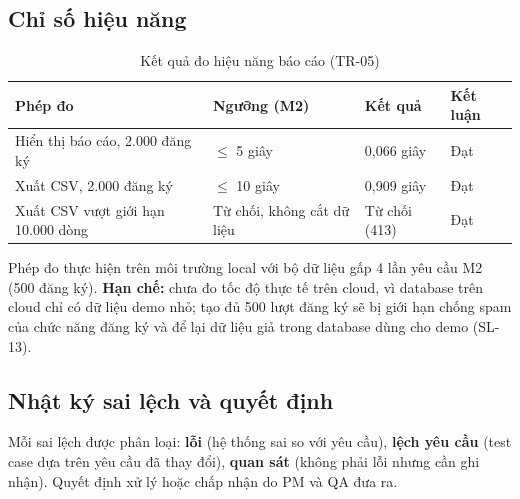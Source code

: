\subsection{Chỉ số hiệu năng}

\begin{table}[H]
\centering\small
\caption{Kết quả đo hiệu năng báo cáo (TR-05)}\label{tab:tr-perf}
\begin{tabularx}{\linewidth}{@{}Xp{.18\linewidth}p{.18\linewidth}p{.14\linewidth}@{}}
\toprule
\textbf{Phép đo} & \textbf{Ngưỡng (M2)} & \textbf{Kết quả} & \textbf{Kết luận}\\\midrule
Hiển thị báo cáo, 2.000 đăng ký & $\le$ 5 giây & 0,066 giây & Đạt\\
Xuất CSV, 2.000 đăng ký & $\le$ 10 giây & 0,909 giây & Đạt\\
Xuất CSV vượt giới hạn 10.000 dòng & Từ chối, không cắt dữ liệu & Từ chối (413) & Đạt\\
\bottomrule
\end{tabularx}
\end{table}

Phép đo thực hiện trên môi trường local với bộ dữ liệu gấp 4 lần yêu cầu M2 (500 đăng ký). \textbf{Hạn chế:} chưa đo tốc độ thực tế trên cloud, vì database trên cloud chỉ có dữ liệu demo nhỏ; tạo đủ 500 lượt đăng ký sẽ bị giới hạn chống spam của chức năng đăng ký và để lại dữ liệu giả trong database dùng cho demo (SL-13).

\subsection{Nhật ký sai lệch và quyết định}

Mỗi sai lệch được phân loại: \textbf{lỗi} (hệ thống sai so với yêu cầu), \textbf{lệch yêu cầu} (test case dựa trên yêu cầu đã thay đổi), \textbf{quan sát} (không phải lỗi nhưng cần ghi nhận). Quyết định xử lý hoặc chấp nhận do PM và QA đưa ra.

